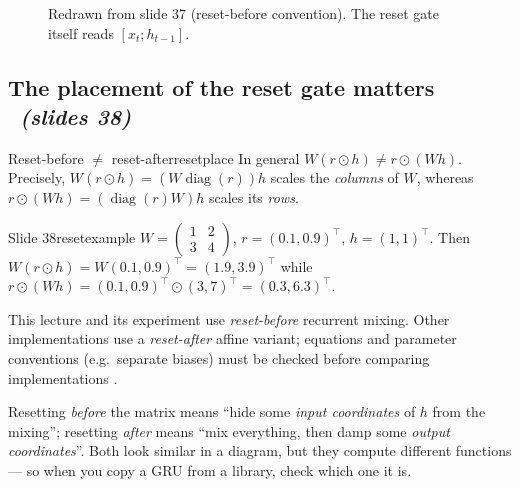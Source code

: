\documentclass[11pt,a4paper]{article}
\newcommand{\diag}{\operatorname{diag}}
\newcommand{\thh}{\tilde h}
\newcommand{\sltag}[1]{\texorpdfstring{\ \emph{(slides #1)}}{ (slides #1)}}
\begin{document}
\begin{figure}[H]\centering
{}
\caption{Redrawn from slide 37 (reset-before convention). The reset gate itself reads $[x_t;h_{t-1}]$.}
\end{figure}

\subsection{The placement of the reset gate matters \sltag{38}}

\begin{proposition}{Reset-before $\neq$ reset-after}{resetplace}
In general $W(r\odot h)\neq r\odot(Wh)$. Precisely, $W(r\odot h)=(W\diag(r))h$ scales the \emph{columns} of $W$, whereas $r\odot(Wh)=(\diag(r)W)h$ scales its \emph{rows}.
\end{proposition}
\begin{example}{Slide 38}{resetexample}
$W=\begin{pmatrix}1&2\\3&4\end{pmatrix}$, $r=(0.1,0.9)^\top$, $h=(1,1)^\top$. Then $W(r\odot h)=W(0.1,0.9)^\top=(1.9,3.9)^\top$ while $r\odot(Wh)=(0.1,0.9)^\top\odot(3,7)^\top=(0.3,6.3)^\top$.
\end{example}
This lecture and its experiment use \emph{reset-before} recurrent mixing. Other implementations use a \emph{reset-after} affine variant; equations and parameter conventions (e.g.\ separate biases) must be checked before comparing implementations \cite{r10}.

\begin{intuition}
Resetting \emph{before} the matrix means ``hide some \emph{input coordinates} of $h$ from the mixing''; resetting \emph{after} means ``mix everything, then damp some \emph{output coordinates}''. Both look similar in a diagram, but they compute different functions --- so when you copy a GRU from a library, check which one it is.
\end{intuition}
\end{document}
